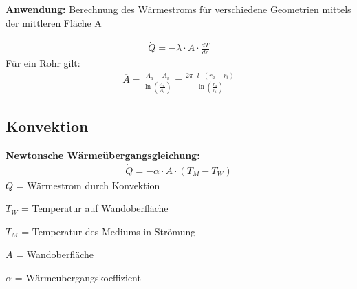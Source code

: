 \documentclass[a4paper,10pt]{article}
\begin{document}
\begin{minipage}[t]{.4\textwidth}
\begin{tcbraster}[raster columns=1, raster valign=top]
\end{tcbraster}
\end{minipage}
\hfill
\begin{minipage}[t]{.5\textwidth}
\pp
{\color{petunitext}\textbf{Anwendung:}}
Berechnung des Wärmestroms für verschiedene Geometrien mittels der mittleren Fläche A

\begin{align*}
\dot{Q} = - \lambda \cdot \overline{A} \cdot \frac{dT}{dr}
\end{align*}
Für ein Rohr gilt:
\begin{align*}
\overline{A} = \frac{A_a-A_i}{\ln(\frac{A_a}{A_i})} = \frac{2 \pi \cdot l \cdot (r_a-r_i)}{\ln(\frac{r_a}{r_i})}
\end{align*}
\vspace*{-8mm}
\subsection{Konvektion}
{\color{petunitext}\textbf{Newtonsche Wärmeübergangsgleichung:}}
\begin{align*}
\dot{Q} = - \alpha \cdot A \cdot (T_M - T_W)
\end{align*}
$\dot{Q}$ = Wärmestrom durch Konvektion \par 
$T_W$ = Temperatur auf Wandoberfläche \par 
$T_M$ = Temperatur des Mediums in Strömung \par 
$A$ = Wandoberfläche \par 
$\alpha$ = Wärmeubergangskoeffizient
\end{minipage}
\end{document}
